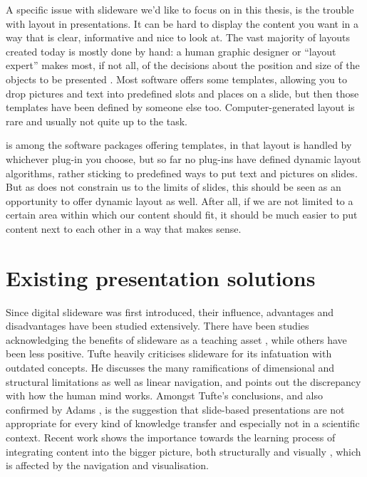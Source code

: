    A specific issue with slideware we'd like to focus on in this thesis, is the
   trouble with layout in presentations. It can be hard to display the content
   you want in a way that is clear, informative and nice to look at. The vast
   majority of layouts created today is mostly done by hand: a human graphic
   designer or ``layout expert'' makes most, if not all, of the decisions about
   the position and size of the objects to be presented \citep{lok-1}. Most
   software offers some templates, allowing you to drop pictures and text into
   predefined slots and places on a slide, but then those templates have been
   defined by someone else too. Computer-generated layout is rare and usually
   not quite up to the task.

   \mxp is among the software packages offering templates, in that layout is
   handled by whichever plug-in you choose, but so far no plug-ins have defined
   dynamic layout algorithms, rather sticking to predefined ways to put text
   and pictures on slides. But as \mxp does not constrain us to the limits of
   slides, this should be seen as an opportunity to offer dynamic layout as
   well. After all, if we are not limited to a certain area within which our
   content should fit, it should be much easier to put content next to each
   other in a way that makes sense.

  \section{Existing presentation solutions}

   Since digital slideware was first introduced, their influence, advantages
   and disadvantages have been studied extensively. There have been studies
   acknowledging the benefits of slideware as a teaching asset
   \citep{holzinger-1}, while others have been less positive. Tufte
   \citeyearpar{tufte-1} heavily criticises slideware for its infatuation with
   outdated concepts. He discusses the many ramifications of dimensional and
   structural limitations as well as linear navigation, and points out the
   discrepancy with how the human mind works. Amongst Tufte's conclusions, and
   also confirmed by Adams \citep{adams-1}, is the suggestion that slide-based
   presentations are not appropriate for every kind of knowledge transfer and
   especially not in a scientific context. Recent work shows the importance
   towards the learning process of integrating content into the bigger picture,
   both structurally and visually \citep{gross-1}, which is affected by the
   navigation and visualisation.

